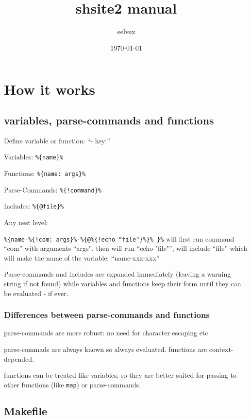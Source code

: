 \documentclass{memoir}
\title{shsite2 manual}
\author{eelvex}
\date{\today}
\newcommand{\var}[1]{\texttt{\%\{#1\}\%}}
\begin{document}
\begin{titlingpage}
\maketitle
\end{titlingpage}
\tableofcontents

\chapter{How it works} %

\section{variables, parse-commands and functions} %

	Define variable or function: ``- key:''

	Variables: \var{name}

	Functions: \var{name: args}

	Parse-Commands: \var{!command}

	Includes:  \var{@file}

	Any nest level:

	\var{name-\var{!com: args}-\var{@\var{!echo "file"}} }
	will first run command ``com'' with arguments ``args'', then will run ``echo "file"'', will include ``file''
	which will make the name of the variable: ``name-xxx-xxx''

	Parse-commands and includes are expanded immediately (leaving a warning
	string if not found) while variables and functions keep their form
	until they can be evaluated - if ever.

	\subsection{Differences between parse-commands and functions} %
		parse-commands are more robust: no need for character escaping etc

		parse-commads are always known so always evaluated. functions are context-depended.

		functions can be treated like variables, so they are better
		suited for passing to other functions (like \texttt{map}) or parse-commands.




\section{Makefile} %
\end{document}
